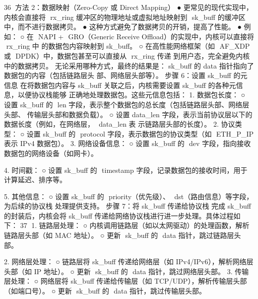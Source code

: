                                                                   36
方法 2：数据映射（Zero-Copy 或 Direct Mapping）
 ● 更常见的现代实现中，内核会直接将 ﻿           rx_ring﻿ 缓冲区的物理地址或虚拟地址映射到 ﻿      sk_buff﻿
    的缓冲区中，而不进行数据拷贝。
 ● 这种方式避免了数据拷贝的开销，提高了性能。
 ● 例如：
     ○ 在 ﻿
         NAPI﻿ + ﻿
                 GRO﻿（Generic Receive Offload）的实现中，内核可以直接将 ﻿  rx_ring﻿ 中
       的数据包内容映射到 ﻿sk_buff﻿。
     ○ 在高性能网络框架（如 ﻿     AF_XDP﻿ 或 ﻿ DPDK﻿）中，数据包甚至可以直接从 ﻿    rx_ring﻿ 传递
       到用户态，完全避免内核中的数据拷贝。
无论采用哪种方式，最终的结果是： sk_buff﻿ 的 ﻿data﻿ 指针指向了数据包的内容（包括链路层头
部、网络层头部等）。
步骤 6：设置 ﻿sk_buff﻿ 的元信息
在将数据包内容与 ﻿sk_buff﻿ 关联之后，内核需要设置 ﻿sk_buff﻿ 的各种元信息，以便协议栈能够
正确地处理数据包。这些元信息包括：
 1. 数据包长度：
     ○ 设置 ﻿sk_buff﻿ 的 ﻿
                      len﻿ 字段，表示整个数据包的总长度（包括链路层头部、网络层头部、
       传输层头部和数据负载）。
     ○ 设置 ﻿data_len﻿ 字段，表示当前协议层以下的数据长度（例如，在网络层， ﻿             data_len﻿ 表
       示链路层头部的长度）。
 2. 协议类型：
     ○ 设置 ﻿sk_buff﻿ 的 ﻿
                      protocol﻿ 字段，表示数据包的协议类型（如 ﻿       ETH_P_IP﻿ 表示 IPv4
       数据包）。
 3. 网络设备信息：
     ○ 设置 ﻿sk_buff﻿ 的 ﻿
                      dev﻿ 字段，指向接收数据包的网络设备（如网卡）。

 4. 时间戳：
     ○ 设置 ﻿sk_buff﻿ 的 ﻿
                      timestamp﻿ 字段，记录数据包的接收时间，用于计算延迟、排序等。

 5. 其他信息：
     ○ 设置 ﻿sk_buff﻿ 的 ﻿
                      priority﻿（优先级）、 ﻿      dst﻿（路由信息）等字段，为后续的协议栈
       处理提供支持。
步骤 7：将 ﻿sk_buff﻿ 传递给协议栈
完成 ﻿sk_buff﻿ 的封装后，内核会将 ﻿sk_buff﻿ 传递给网络协议栈进行进一步处理。具体过程如
下：
                                                                       37
1. 链路层处理：
    ○ 内核调用链路层（如以太网驱动）的处理函数，解析链路层头部（如 MAC 地址）。
    ○ 更新 ﻿
         sk_buff﻿ 的 ﻿
                    data﻿ 指针，跳过链路层头部。

2. 网络层处理：
    ○ 链路层将 ﻿sk_buff﻿ 传递给网络层（如 IPv4/IPv6），解析网络层头部（如 IP 地址）。
    ○ 更新 ﻿
         sk_buff﻿ 的 ﻿
                    data﻿ 指针，跳过网络层头部。
3. 传输层处理：
    ○ 网络层将 ﻿sk_buff﻿ 传递给传输层（如 TCP/UDP），解析传输层头部（如端口号）。
    ○ 更新 ﻿
         sk_buff﻿ 的 ﻿
                    data﻿ 指针，跳过传输层头部。

